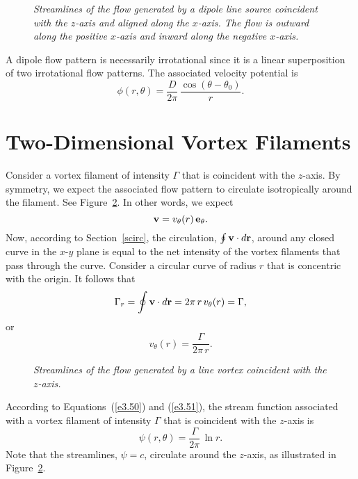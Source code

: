 \begin{figure}
\epsfysize=3in
\centerline{}
\caption{\em Streamlines of the flow generated by a dipole line source coincident with the $z$-axis and
aligned along the $x$-axis. The flow is outward along the positive $x$-axis and inward
along the negative $x$-axis.}\label{fdipole}
\end{figure}

 A dipole flow pattern is necessarily irrotational since it is a linear superposition of two irrotational flow patterns.
 The associated velocity potential is
 \begin{equation}
 \phi(r,\theta) = \frac{D}{2\pi}\,\frac{\cos(\theta-\theta_0)}{r}.
 \end{equation}

\section{Two-Dimensional Vortex Filaments}\label{svortex}
Consider a vortex filament of intensity $\Gamma$ that is coincident with the $z$-axis. By symmetry, we expect the associated flow pattern  to circulate isotropically around the filament.
See Figure~\ref{fvortex1}. In other words, we expect
\begin{equation}
{\bf v} = v_\theta(r)\,{\bf e}_\theta.
\end{equation}
Now, according to Section~\ref{scirc}, 
the circulation, $\oint {\bf v}\cdot d{\bf r}$, around any closed curve in the $x$-$y$ plane  is equal to the net intensity of the vortex filaments that pass through the curve. Consider a circular curve of radius $r$ that is concentric with the origin. It follows that
\begin{equation}
\Gamma_r = \oint {\bf v}\cdot d{\bf r}= 2\pi\,r\,v_\theta(r) = \Gamma,
\end{equation}
or
\begin{equation}\label{e3.69}
v_\theta(r) = \frac{\Gamma}{2\pi\,r}.
\end{equation}

\begin{figure}
\epsfysize=3in
\centerline{}
\caption{\em Streamlines of the flow generated by a line vortex coincident with the $z$-axis.}\label{fvortex1}
\end{figure}

According to Equations~(\ref{e3.50}) and (\ref{e3.51}), the stream function associated with a vortex filament
of intensity $\Gamma$ that is coincident with the $z$-axis is
\begin{equation}\label{e3.74}
\psi(r,\theta) = \frac{\Gamma}{2\pi}\,\ln r.
\end{equation}
Note that the streamlines, $\psi=c$, circulate around the $z$-axis, as illustrated in Figure~\ref{fvortex1}. 


